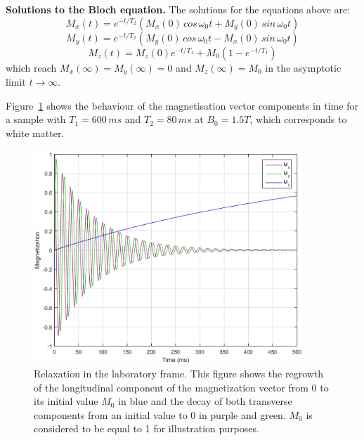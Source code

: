 \hfill

\textbf{Solutions to the Bloch equation.} 
The solutions for the equations above are:
\begin{equation} \label{eq:425}
    M_x(t) = e^{-t/T_2} (M_x(0) \, cos \, \omega_0 t + M_y(0) \, sin \, \omega_0 t)
\end{equation}
\begin{equation} \label{eq:426}
    M_y(t) = e^{-t/T_2} (M_y(0) \, cos \, \omega_0 t - M_x(0) \, sin \, \omega_0 t)
\end{equation}
\begin{equation} \label{eq:427}
    M_z(t) = M_z(0) e^{-t/T_1} + M_0 (1 - e^{-t/T_1})
\end{equation}
which reach $M_x(\infty) = M_y(\infty) = 0$ and $M_z(\infty) = M_0$ in the asymptotic limit $t \rightarrow \infty$.

Figure~\ref{fig:ch4MxMyMz} shows the behaviour of the magnetisation vector components in time for a sample with $T_1 = 600 \, ms$ and $T_2 = 80 \, ms$ at $B_0 = 1.5T$, which corresponds to white matter.

\begin{figure}[ht]
    \centering
    \includegraphics[width=0.9\textwidth,keepaspectratio]{images/mri/ch4MxMyMz}
    \caption{Relaxation in the laboratory frame. This figure shows the regrowth of the longitudinal component of the magnetization vector from 0 to its initial value $M_0$ in blue and the decay of both transverse components from an initial value to 0 in purple and green. $M_0$ is considered to be equal to 1 for illustration purposes.}
    \label{fig:ch4MxMyMz}
\end{figure}

